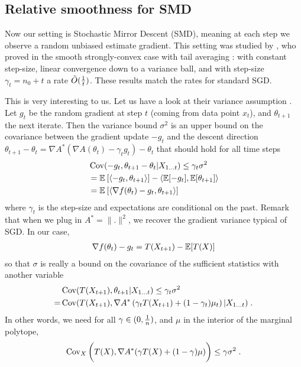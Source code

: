 \documentclass{article}
\newcommand*{\expect}[2][]{\ensuremath{\mathbb{E}_{#1} \left[ #2 \right] }} %
\newcommand{\logpart}{A}
\newcommand{\conj}{\logpart^*}
\newcommand{\natp}{\theta}
\newcommand{\lr}{\gamma} %
\begin{document}
\subsection{Relative smoothness for SMD}
Now our setting is Stochastic Mirror Descent (SMD), meaning at each step we observe a random unbiased estimate gradient. This setting was studied by \citet{hanzely2018fastest}, who proved in the smooth strongly-convex case with tail averaging :  with constant step-size, linear convergence down to a variance ball, and with step-size $\gamma_t = n_0 + t$ a rate $\tilde O(\frac{1}{t})$. These results match the rates for standard SGD.

This is very interesting to us.
Let us have a look at their variance assumption \citep[Assumption 5.1]{hanzely2018fastest}.
Let $g_t$ be the random gradient at step $t$  (coming from data point $x_t$), and $\natp_{t+1}$ the next iterate. Then the variance bound $\sigma^2$ is an upper bound on the covariance between the gradient update  $-g_t$ and the descent direction $\natp_{t+1} - \natp_t = \nabla \logpart^*(\nabla \logpart(\natp_t) - \lr_t g_t ) - \natp_t $ that should hold for all time steps  
\begin{align}
	&\Cov(- g_t,\natp_{t+1} - \natp_t | X_{1 \dots t}) \leq \lr_t \sigma^2 \\
	&= \expect{\langle - g_t, \natp_{t+1} \rangle}  - \langle \E[-g_t], \E[\natp_{t+1}] \rangle   \\
	 &= \expect{\langle \nabla f(\natp_t) - g_t , \natp_{t+1}  \rangle}
\end{align}
where $\gamma_t$ is the step-size and expectations are conditional on the past. Remark that when we plug in $\conj = \|.\|^2$, we recover the gradient variance typical of SGD. In our case, 
\begin{align}
	\nabla f(\natp_t) - g_t =  T(X_{t+1})	- \E[T(X)]
\end{align}
so that $\sigma$ is really a bound on the covariance of the sufficient statistics with another variable
\begin{align}
	&\Cov( T(X_{t+1}), \natp_{t+1}| X_{1\dots t})
	\leq \lr_t\sigma^2 \\
	=& \Cov(T(X_{t+1}), \nabla\conj \left(\lr_t T(X_{t+1}) + (1-\lr_t ) \mu_t \right) | X_{1\dots t}) \;.
\end{align}
In other words, we need for all $\lr\in(0,\inv{n})$, and $ \mu$ in the interior of the marginal polytope,
\begin{align}
\label{eq:hypvariance}
	\Cov_X \bigg(T(X), \nabla \conj (\lr T(X) + (1-\lr) \mu)\bigg	) 
	\leq \lr \sigma^2 \; .
\end{align}
\end{document}
